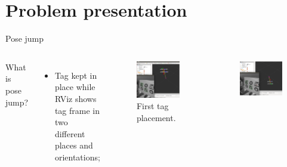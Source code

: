 \documentclass[10pt]{beamer}
\begin{document}
\section{Problem presentation}


\begin{frame}[fragile]{Pose jump}

  \begin{columns}
      What is pose jump?
      \begin{itemize}
        \item Tag kept in place while RViz shows tag frame in two different places and orientations;
      \end{itemize}
      \begin{figure}
        \includegraphics[scale=0.15]{pj01}
        \caption{First tag placement.}
      \end{figure}
      \begin{figure}
        \includegraphics[scale=0.15]{pj02}

\end{figure}
\end{columns}
\end{frame}
\end{document}
